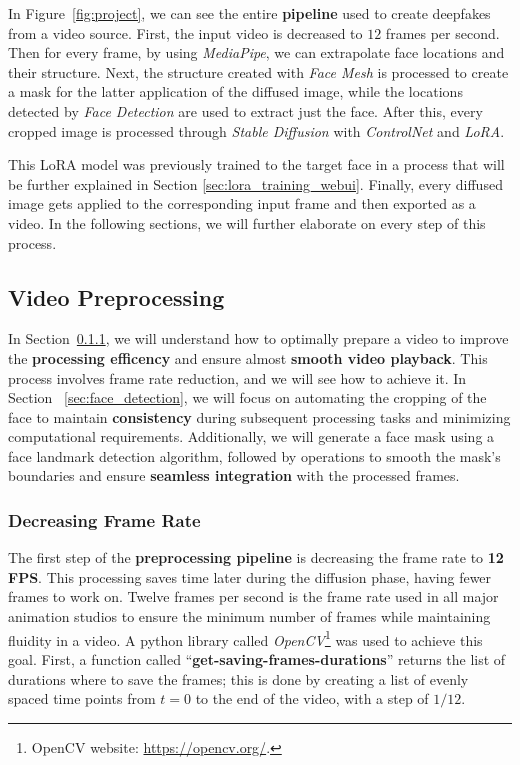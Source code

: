 \documentclass[preprint]{elsarticle}
\begin{document}
In Figure~\ref{fig:project}, we can see the entire \textbf{pipeline} used to create deepfakes from a video source. 
First, the input video is decreased to $12$ frames per second. Then for every frame, by using \emph{MediaPipe}, we can extrapolate face locations and their structure.  Next, the structure created with \emph{Face Mesh} is processed to create a mask for the latter application of the diffused image, 
while the locations detected by \emph{Face Detection} are used to extract just the face. After this, every cropped image is processed through \emph{Stable Diffusion} with \emph{ControlNet} and \emph{LoRA}. 

This LoRA model was previously trained to the target face in a process that will be further explained in Section \ref{sec:lora_training_webui}.  Finally, every diffused image gets applied to the corresponding input frame and then exported as a video. In the following sections, we will further elaborate on every step of this process. 



\subsection{Video Preprocessing} \label{sec:video_preprocessing}

In Section~\ref{sec:decreasing_frame_rate}, we will understand how to optimally prepare a video to improve the \textbf{processing efficency} and ensure almost \textbf{smooth video playback}. This process involves frame rate reduction, and we will see how to achieve it.
In Section ~\ref{sec:face_detection}, we will focus on automating the cropping of the face to maintain \textbf{consistency} during subsequent processing tasks and minimizing computational requirements. Additionally, we will generate a face mask using a face landmark detection algorithm, followed by operations to smooth the mask's boundaries and ensure \textbf{seamless integration} with the processed frames.



\subsubsection{Decreasing Frame Rate}\label{sec:decreasing_frame_rate}

The first step of the \textbf{preprocessing pipeline} is decreasing the frame rate to \textbf{12 FPS}. 
This processing saves time later during the diffusion phase, having fewer frames to work on. 
Twelve frames per second is the frame rate used in all major animation studios to ensure the minimum number of  frames while maintaining fluidity in a video. A python library called \emph{OpenCV}\footnote{OpenCV website: \url{https://opencv.org/}.} 
was used to achieve this goal.  First, a function called ``\textbf{get-saving-frames-durations}'' returns the list of durations where to save the frames; this is done by creating a list of evenly spaced time points from $t=0$ to the end of the video, with a step of $1/12$. 
\end{document}
